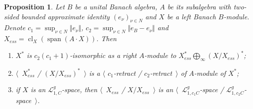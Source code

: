 \documentclass[12pt]{article}
\newtheorem{proposition}[theorem]{Proposition}
\begin{document}
\begin{proposition}\label{DualBanModDecomp} Let $B$ be a unital Banach algebra,
$A$ be its subalgebra with two-sided bounded approximate identity
${(e_\nu)}_{\nu\in N}$ and $X$ be a left Banach $B$-module. Denote
$c_1=\sup_{\nu\in N}\Vert e_\nu\Vert$, $c_2=\sup_{\nu\in N}\Vert e_B-e_\nu\Vert$
and $X_{ess}=\operatorname{cl}_X(\operatorname{span}(A\cdot X))$. Then
\begin{enumerate}[label = (\roman*)]
\item $X^*$ is $c_2(c_1+1)$-isomorphic as a right $A$-module to
$X_{ess}^*\bigoplus_\infty {(X/X_{ess})}^*$;
\item $\langle$~$X_{ess}^*$ / ${(X/X_{ess})}^*$~$\rangle$ is a $\langle$
$c_1$-retract / $c_2$-retract~$\rangle$ of $A$-module of $X^*$;
\item if $X$ is an $\mathcal{L}_{1,C}^g$-space, then $\langle$~$X_{ess}$ /
$X/X_{ess}$~$\rangle$ is an $\langle$~$\mathcal{L}_{1,c_1C}^g$-space /
$\mathcal{L}_{1,c_2C}^g$-space~$\rangle$.
\end{enumerate}
\end{proposition}
\end{document}
